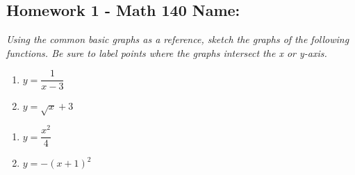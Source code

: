 \documentclass[10pt]{article}
\begin{document}
\pagestyle{empty}
\subsection*{Homework 1 - Math 140 \hfill Name: \underline{\hspace*{2in}}}
\textit{Using the common basic graphs as a reference, sketch the graphs of the following functions.  Be sure to label points where the graphs intersect the x or y-axis.  } 
\begin{multicols}{2}
\begin{enumerate}
\item $y = \dfrac{1}{x-3}$ \\
\begin{center}
\end{center}

\item $y = \sqrt{x} + 3$ \\
\begin{center}
\end{center}
\setcounter{enumCount}{\theenumi}
\end{enumerate}
\end{multicols}


\begin{multicols}{2}
\begin{enumerate}
\setcounter{enumi}{\theenumCount}
\item $y = \dfrac{x^2}{4}$ \\
\begin{center}
\end{center}

\item $y = -(x+1)^2$ \\
\begin{center}
\end{center}
\setcounter{enumCount}{\theenumi}
\end{enumerate}
\end{multicols}
\end{document}
